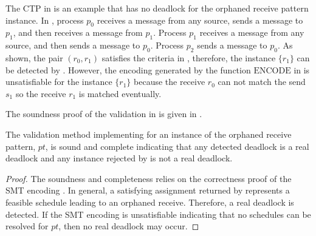\examplefigtwo

The CTP in  is an example that has no deadlock for the orphaned receive pattern instance. In , process $p_0$ receives a message from any source, sends a message to $p_1$, and then receives a message from $p_1$. Process $p_1$ receives a message from any source, and then sends a message to $p_0$. Process $p_2$ sends a message to $p_0$. As shown, the pair $(r_0,r_1)$ satisfies the criteria in , therefore, the instance $\{r_1\}$ can be detected by . However, the encoding generated by the function $\mathrm{ENCODE}$ in  is unsatisfiable for the instance $\{r_1\}$ because the receive $r_0$ can not match the send $s_1$ so the receive $r_1$ is matched eventually.

The soundness proof of the validation in  is given in .

\begin{lemma}
The validation method implementing  for an instance of the orphaned receive pattern, $\mathit{pt}$, is sound and complete indicating that any detected deadlock is a real deadlock and any instance rejected by  is not a real deadlock. 
\label{lemma:mismatch}
\end{lemma}
\begin{proof}
The soundness and completeness relies on the correctness proof of the SMT encoding \cite{DBLP:conf/kbse/HuangMM13}. In general, a satisfying assignment returned by  represents a feasible schedule leading to an orphaned receive. Therefore, a real deadlock is detected. If the SMT encoding is unsatisfiable indicating that no schedules can be resolved for $pt$, then no real deadlock may occur.
\end{proof}



